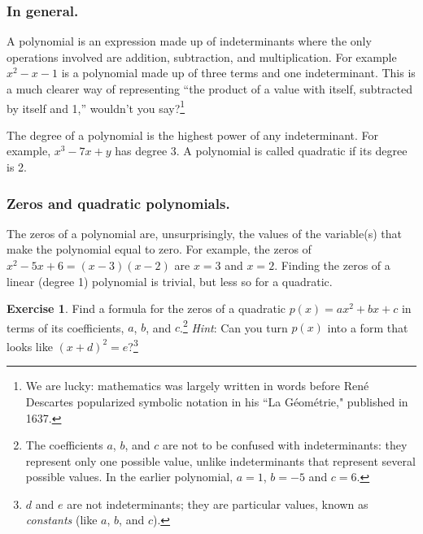 \documentclass{book}
\theoremstyle{definition}
\newtheorem{exercise}{Exercise}[chapter]
\theoremstyle{colonstylebf}
\begin{document}
\subsubsection*{In general.}
A polynomial is an expression made up of indeterminants where the only operations involved are addition, subtraction, and multiplication. For example $x^2 - x - 1$ is a polynomial made up of three terms and one indeterminant. This is a much clearer way of representing ``the product of a value with itself, subtracted by itself and 1,'' wouldn't you say?\footnote{We are lucky: mathematics was largely written in words before Ren\'e Descartes popularized symbolic notation in his ``La G\'eom\'etrie," published in 1637.}

The degree of a polynomial is the highest power of any indeterminant. For example, $x^3 - 7x + y$ has degree 3. A polynomial is called quadratic if its degree is 2.

\subsubsection*{Zeros and quadratic polynomials.}
The zeros of a polynomial are, unsurprisingly, the values of the variable(s) that make the polynomial equal to zero. For example, the zeros of $x^2 - 5x + 6 = (x-3)(x-2)$ are $x = 3$ and $x = 2$. Finding the zeros of a linear (degree 1) polynomial is trivial, but less so for a quadratic.

\begin{exercise}\label{completesquare}
Find a formula for the zeros of a quadratic $p(x) = ax^2 + bx + c$ in terms of its coefficients, $a$, $b$, and $c$.\footnote{The coefficients $a$, $b$, and $c$ are not to be confused with indeterminants: they represent only one possible value, unlike indeterminants that represent several possible values. In the earlier polynomial, $a = 1$, $b = -5$ and $c = 6$.} \emph{Hint}: Can you turn $p(x)$ into a form that looks like $(x + d)^2 = e$?\footnote{$d$ and $e$ are not indeterminants; they are particular values, known as \emph{constants}  (like $a$, $b$, and $c$).}
\end{exercise}

\end{document}
